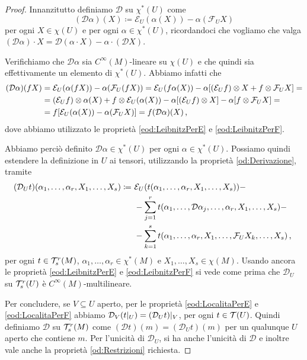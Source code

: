 \begin{proof}
	Innanzitutto definiamo $\mathcal D$ su $\chi^*(U)$ come 
	\begin{equation*}
	(\mathcal D\alpha) (X) \coloneqq \mathcal E_U(\alpha(X)) - \alpha( \mathcal F_UX)
	\end{equation*}
	per ogni $X\in\chi(U)$ e per ogni $\alpha \in \chi^*(U)$, ricordandoci che vogliamo che valga $(\mathcal D\alpha)\cdot X = \mathcal D(\alpha\cdot X) - \alpha\cdot(\mathcal D X)$.
	
	Verifichiamo che $\mathcal D\alpha$ sia $C^\infty(M)$-lineare su $\chi(U)$ e che quindi sia effettivamente un elemento di $\chi^*(U)$.
	Abbiamo infatti che
	\begin{align*}
		(\mathcal D\alpha)(fX) &= \mathcal E_U(\alpha(fX)) - \alpha(\mathcal F_U(fX))= \mathcal E_U(f\alpha (X)) - \alpha [(\mathcal E_Uf)\otimes X + f \otimes \mathcal F_UX] = \\
		&= (\mathcal E_U f)\otimes \alpha (X) + f \otimes \mathcal E_U (\alpha (X)) - \alpha [(\mathcal E_U f) \otimes X] - \alpha [f \otimes \mathcal F_U X] = \\
		&= f [\mathcal E_U (\alpha (X))- \alpha( \mathcal F_UX)] = f(\mathcal D\alpha) (X) \, \text{, }
	\end{align*}
	dove abbiamo utilizzato le proprietà \ref{eod:LeibnitzPerE} e \ref{eod:LeibnitzPerF}.
	
	Abbiamo perciò definito $\mathcal D\alpha \in \chi^*(U)$ per ogni $\alpha\in\chi^*(U)$. Possiamo quindi estendere la definizione in $U$ ai tensori, utilizzando la proprietà \ref{od:Derivazione}, tramite 
	\begin{align*}
		(\mathcal D_U t) (\alpha_1,\ldots,\alpha_r,X_1,\ldots,X_s) \coloneqq\ & \mathcal E_U(t(\alpha_1,\ldots,\alpha_r,X_1,\ldots,X_s)) -\\
		&-\sum_{j=1}^rt(\alpha_1,\ldots, \mathcal D\alpha_j,\ldots,\alpha_r,X_1,\ldots,X_s) -\\
		&- \sum_{k=1}^s t(\alpha_1,\ldots,\alpha_r,X_1,\ldots,\mathcal F_UX_k,\ldots,X_s)\, \text{, }
	\end{align*}
	per ogni $t\in\mathcal T_s^r(M)$, $\alpha_1,\ldots,\alpha_r\in\chi^*(M)$ e $X_1,\ldots,X_s\in\chi(M)$.
	Usando ancora le proprietà \ref{eod:LeibnitzPerE} e \ref{eod:LeibnitzPerF} si vede come prima che $\mathcal D_U$ su $\mathcal T_s^r(U)$ è $C^\infty(M)$-multilineare.

Per concludere, se $V\subseteq U$ aperto, per le proprietà \ref{eod:LocalitaPerE} e \ref{eod:LocalitaPerF} abbiamo $\mathcal D_V(t|_ U) = (\mathcal D_U t)|_ V$, per ogni $t\in\mathcal T(U)$.
Quindi definiamo $\mathcal D$ su $\mathcal T_s^r(M)$ come $(\mathcal D t) (m) = (\mathcal D_U t) (m)$ per un qualunque $U$ aperto che contiene $m$.
Per l'unicità di $\mathcal D_U$, si ha anche l'unicità di $\mathcal D$ e inoltre vale anche la proprietà \ref{od:Restrizioni} richiesta.
\end{proof}

